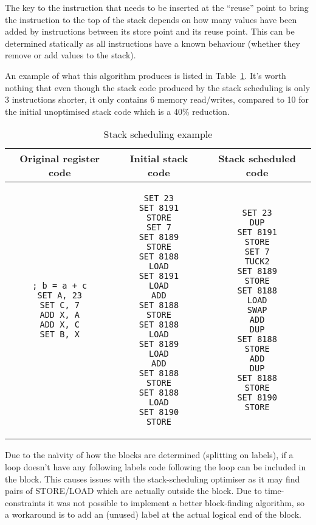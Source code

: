 The key to the instruction that needs to be inserted at the ``reuse'' point to
bring the instruction to the top of the stack depends on how many values have
been added by instructions between its store point and its reuse point. This can
be determined statically as all instructions have a known behaviour (whether
they remove or add values to the stack).

An example of what this algorithm produces is listed in
Table~\ref{tab:scheduleex}. It's worth nothing that even though the stack code
produced by the stack scheduling is only 3 instructions shorter, it only
contains 6 memory read/writes, compared to 10 for the initial unoptimised stack
code which is a 40\% reduction.

\begin{table}
\caption{Stack scheduling example}
\begin{tabular}{c c c}\label{tab:scheduleex}
  Original register code & Initial stack code & Stack scheduled code
  \\ \toprule
\begin{lstlisting}
; b = a + c
SET A, 23
SET C, 7
ADD X, A
ADD X, C
SET B, X
\end{lstlisting} &
\begin{lstlisting}
SET 23
SET 8191
STORE
SET 7
SET 8189
STORE
SET 8188
LOAD
SET 8191
LOAD
ADD
SET 8188
STORE
SET 8188
LOAD
SET 8189
LOAD
ADD
SET 8188
STORE
SET 8188
LOAD
SET 8190
STORE
\end{lstlisting} &
\begin{lstlisting}
SET 23
DUP
SET 8191
STORE
SET 7
TUCK2
SET 8189
STORE
SET 8188
LOAD
SWAP
ADD
DUP
SET 8188
STORE
ADD
DUP
SET 8188
STORE
SET 8190
STORE
\end{lstlisting} \\
\end{tabular}
\end{table}

Due to the na{\"\i}vity of how the blocks are determined (splitting on labels),
if a loop doesn't have any following labels code following the loop can be
included in the block. This causes issues with the stack-scheduling optimiser as
it may find pairs of STORE/LOAD which are actually outside the block. Due to
time-constraints it was not possible to implement a better block-finding
algorithm, so a workaround is to add an (unused) label at the actual logical end
of the block.

